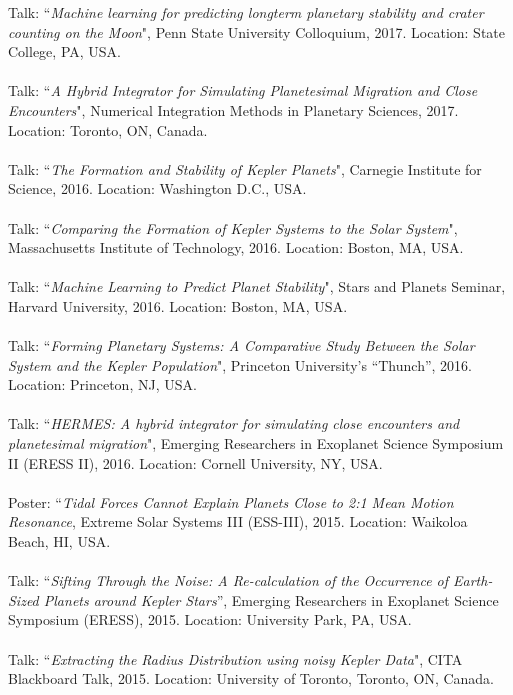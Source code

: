 \documentclass[10pt]{res} %
\begin{document}
\begin{resume}
\vspace{8pt} %
Talk: ``{\sl Machine learning for predicting longterm planetary stability and crater counting on the Moon}", Penn State University Colloquium, 2017. Location: State College, PA, USA. \\ \\
Talk: ``{\sl A Hybrid Integrator for Simulating Planetesimal Migration and Close Encounters}", Numerical Integration Methods in Planetary Sciences, 2017. Location: Toronto, ON, Canada. \\ \\
Talk: ``{\sl The Formation and Stability of Kepler Planets}", Carnegie Institute for Science, 2016. Location: Washington D.C., USA. \\ \\
Talk: ``{\sl Comparing the Formation of Kepler Systems to the Solar System}", Massachusetts Institute of Technology, 2016. Location: Boston, MA, USA. \\ \\
Talk: ``{\sl Machine Learning to Predict Planet Stability}", Stars and Planets Seminar, Harvard University, 2016. Location: Boston, MA, USA. \\ \\
Talk: ``{\sl Forming Planetary Systems: A Comparative Study Between the Solar System and the Kepler Population}", Princeton University's ``Thunch'', 2016. Location: Princeton, NJ, USA. \\ \\
Talk: ``{\sl HERMES: A hybrid integrator for simulating close encounters and planetesimal migration}", Emerging Researchers in Exoplanet Science Symposium II (ERESS II), 2016. Location: Cornell University, NY, USA. \\ \\
Poster: ``{\sl Tidal Forces Cannot Explain Planets Close to 2:1 Mean Motion Resonance}, Extreme Solar Systems III (ESS-III), 2015. Location: Waikoloa Beach, HI, USA. \\ \\
Talk: ``{\sl Sifting Through the Noise: A Re-calculation of the Occurrence of Earth-Sized Planets around Kepler Stars}'', Emerging Researchers in Exoplanet Science Symposium (ERESS), 2015. Location: University Park, PA, USA. \\ \\
Talk: ``{\sl Extracting the Radius Distribution using noisy Kepler Data}", CITA Blackboard Talk, 2015. Location: University of Toronto, Toronto, ON, Canada. \\ \\

\end{resume}
\end{document}
